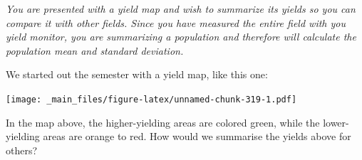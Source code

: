 \documentclass[
]{book}
\newenvironment{Shaded}{\begin{snugshade}}{\end{snugshade}}
\newcommand{\AttributeTok}[1]{\textcolor[rgb]{0.77,0.63,0.00}{#1}}
\newcommand{\ConstantTok}[1]{\textcolor[rgb]{0.00,0.00,0.00}{#1}}
\newcommand{\DecValTok}[1]{\textcolor[rgb]{0.00,0.00,0.81}{#1}}
\newcommand{\FunctionTok}[1]{\textcolor[rgb]{0.00,0.00,0.00}{#1}}
\newcommand{\NormalTok}[1]{#1}
\newcommand{\OtherTok}[1]{\textcolor[rgb]{0.56,0.35,0.01}{#1}}
\newcommand{\SpecialCharTok}[1]{\textcolor[rgb]{0.00,0.00,0.00}{#1}}
\newcommand{\StringTok}[1]{\textcolor[rgb]{0.31,0.60,0.02}{#1}}
\begin{document}
\emph{You are presented with a yield map and wish to summarize its yields so you can compare it with other fields. Since you have measured the entire field with you yield monitor, you are summarizing a population and therefore will calculate the population mean and standard deviation.}

We started out the semester with a yield map, like this one:

\begin{Shaded}
\end{Shaded}

\texttt{[image: \_main\_files/figure-latex/unnamed-chunk-319-1.pdf]}

In the map above, the higher-yielding areas are colored green, while the lower-yielding areas are orange to red. How would we summarise the yields above for others?
\end{document}
